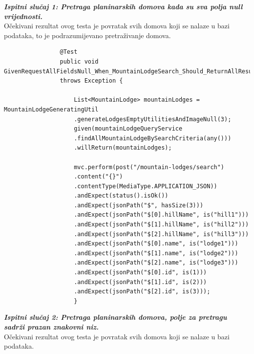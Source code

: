 			\textbf{\textit{Ispitni slučaj 1: Pretraga planinarskih domova kada su sva polja null vrijednosti.}}\\
			Očekivani rezultat ovog testa je povratak svih domova koji se nalaze u bazi podataka, to je podrazumijevano pretraživanje domova.\\
			
			
			\begin{lstlisting}
				@Test
				public void GivenRequestAllFieldsNull_When_MountainLodgeSearch_Should_ReturnAllResults()
				throws Exception {
					
					List<MountainLodge> mountainLodges = MountainLodgeGeneratingUtil
					.generateLodgesEmptyUtilitiesAndImageNull(3);
					given(mountainLodgeQueryService
					.findAllMountainLodgeBySearchCriteria(any()))
					.willReturn(mountainLodges);
					
					mvc.perform(post("/mountain-lodges/search")
					.content("{}")
					.contentType(MediaType.APPLICATION_JSON))
					.andExpect(status().isOk())
					.andExpect(jsonPath("$", hasSize(3)))
					.andExpect(jsonPath("$[0].hillName", is("hill1")))
					.andExpect(jsonPath("$[1].hillName", is("hill2")))
					.andExpect(jsonPath("$[2].hillName", is("hill3")))
					.andExpect(jsonPath("$[0].name", is("lodge1")))
					.andExpect(jsonPath("$[1].name", is("lodge2")))
					.andExpect(jsonPath("$[2].name", is("lodge3")))
					.andExpect(jsonPath("$[0].id", is(1)))
					.andExpect(jsonPath("$[1].id", is(2)))
					.andExpect(jsonPath("$[2].id", is(3)));
					}
			\end{lstlisting}


			\textbf{\textit{Ispitni slučaj 2: Pretraga planinarskih domova, polje za pretragu sadrži prazan znakovni niz.}}\\
			Očekivani rezultat ovog testa je povratak svih domova koji se nalaze u bazi podataka.\\
			
